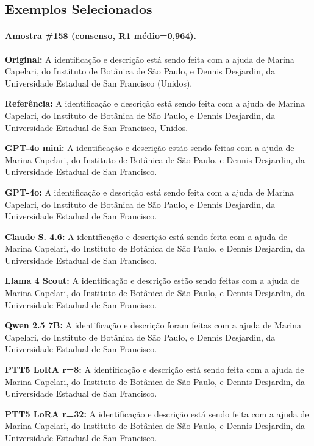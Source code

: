 \documentclass[a4paper, twocolumn, 11pt, twoside]{article}
\begin{document}
\subsection{Exemplos Selecionados}

\footnotesize

\medskip
\paragraph*{Amostra \#158 (consenso, R1 médio=0,964).}

\textbf{Original:} A identificação e descrição está sendo feita com a ajuda de Marina Capelari, do Instituto de Botânica de São Paulo, e Dennis Desjardin, da Universidade Estadual de San Francisco (Unidos).

\textbf{Referência:} A identificação e descrição está sendo feita com a ajuda de Marina Capelari, do Instituto de Botânica de São Paulo, e Dennis Desjardin, da Universidade Estadual de San Francisco, Unidos.

\textbf{GPT-4o mini:} A identificação e descrição estão sendo feitas com a ajuda de Marina Capelari, do Instituto de Botânica de São Paulo, e Dennis Desjardin, da Universidade Estadual de San Francisco.

\textbf{GPT-4o:} A identificação e descrição está sendo feita com a ajuda de Marina Capelari, do Instituto de Botânica de São Paulo, e Dennis Desjardin, da Universidade Estadual de San Francisco.

\textbf{Claude S. 4.6:} A identificação e descrição está sendo feita com a ajuda de Marina Capelari, do Instituto de Botânica de São Paulo, e Dennis Desjardin, da Universidade Estadual de San Francisco.

\textbf{Llama 4 Scout:} A identificação e descrição estão sendo feitas com a ajuda de Marina Capelari, do Instituto de Botânica de São Paulo, e Dennis Desjardin, da Universidade Estadual de San Francisco.

\textbf{Qwen 2.5 7B:} A identificação e descrição foram feitas com a ajuda de Marina Capelari, do Instituto de Botânica de São Paulo, e Dennis Desjardin, da Universidade Estadual de San Francisco.

\textbf{PTT5 LoRA r=8:} A identificação e descrição está sendo feita com a ajuda de Marina Capelari, do Instituto de Botânica de São Paulo, e Dennis Desjardin, da Universidade Estadual de San Francisco.

\textbf{PTT5 LoRA r=32:} A identificação e descrição está sendo feita com a ajuda de Marina Capelari, do Instituto de Botânica de São Paulo, e Dennis Desjardin, da Universidade Estadual de San Francisco.
\end{document}
